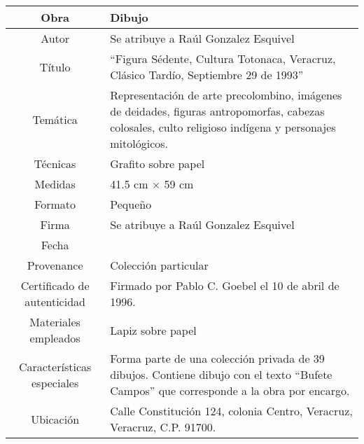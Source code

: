 \documentclass[10pt,letter]{report}
\begin{document}
\begin{table}[H]
\centering
\begin{tabular}{|c|m{}|}
\hline
Obra& Dibujo	\\
\hline
Autor & Se atribuye a Ra\'ul Gonzalez Esquivel\\
\hline
T\'itulo & ``Figura S\'edente, Cultura Totonaca, Veracruz, Cl\'asico Tard\'io, Septiembre 29 de 1993'' \\
\hline
Tem\'atica & Representaci\'on de arte precolombino, im\'agenes de deidades, figuras antropomorfas, cabezas colosales, culto religioso ind\'igena y personajes mitol\'ogicos.\\
\hline
T\'ecnicas &Grafito sobre papel \\
\hline
Medidas & 41.5 cm $\times$ 59 cm \\
\hline
 Formato & Peque\~no \\
 \hline
 Firma & Se atribuye a Ra\'ul Gonzalez Esquivel \\
 \hline
 Fecha & \\
 \hline
 Provenance & Colecci\'on particular\\
 \hline
 Certificado de autenticidad& Firmado por Pablo C. Goebel el 10 de abril de 1996.  \\
 \hline 
  Materiales empleados & Lapiz sobre papel\\
 \hline
 Caracter\'isticas especiales & Forma parte de una colecci\'on privada de 39 dibujos. 
Contiene dibujo con el texto ``Bufete Campos'' que corresponde a la obra por encargo. \\
\hline 
Ubicaci\'on & Calle Constituci\'on 124, colonia Centro, Veracruz, Veracruz, C.P. 91700.\\
\hline
\end{tabular}
\end{table}
\end{document}
